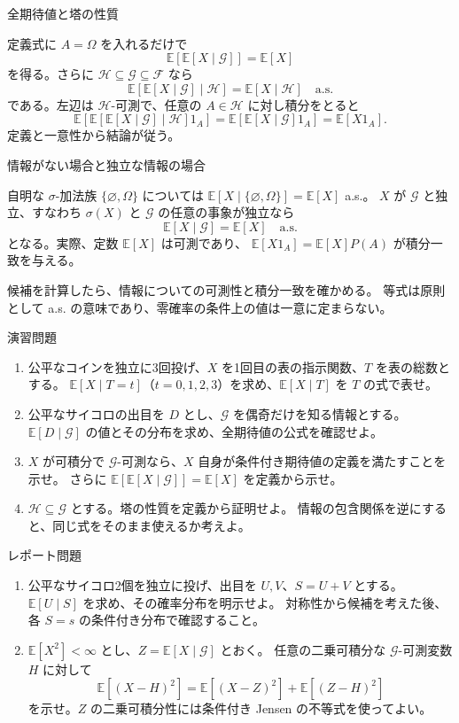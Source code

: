 \documentclass[a4paper,10pt,pdflatex,ja=standard,jafont=ipaex-type1,
  magstyle=real,scale=1]{bxjsarticle}
\newcommand{\topic}[1]{\par\vspace{5pt}
  {\large\sffamily\mdseries\color{accent}#1}\par\vspace{2pt}}
\newcommand{\keybox}[1]{\par\vspace{3pt}\begingroup
  \setlength{\fboxsep}{5pt}
  \colorbox{soft}{\parbox{\dimexpr\linewidth-2\fboxsep\relax}{#1}}%
  \endgroup\par\vspace{2pt}}
\newcommand{\F}{\mathcal F}
\newcommand{\E}{\mathbb E}
\newcommand{\ind}{\mathrm{1}}
\begin{document}
\topic{全期待値と塔の性質}
定義式に $A=\Omega$ を入れるだけで
$$\E[\E[X\mid\mathcal G]]=\E[X]$$
を得る。さらに $\mathcal H\subseteq\mathcal G\subseteq\F$ なら
$$\E[\E[X\mid\mathcal G]\mid\mathcal H]
 =\E[X\mid\mathcal H]\quad\text{a.s.}$$
である。左辺は $\mathcal H$-可測で、任意の $A\in\mathcal H$ に対し積分をとると
$$\E[\E[\E[X\mid\mathcal G]\mid\mathcal H]\ind_A]
 =\E[\E[X\mid\mathcal G]\ind_A]=\E[X\ind_A].$$
定義と一意性から結論が従う。

\topic{情報がない場合と独立な情報の場合}
自明な $\sigma$-加法族 $\{\varnothing,\Omega\}$ については
$\E[X\mid\{\varnothing,\Omega\}]=\E[X]$ a.s.。
$X$ が $\mathcal G$ と独立、すなわち $\sigma(X)$ と $\mathcal G$ の任意の事象が独立なら
$$\E[X\mid\mathcal G]=\E[X]\quad\text{a.s.}$$
となる。実際、定数 $\E[X]$ は可測であり、
$\E[X\ind_A]=\E[X]P(A)$ が積分一致を与える。

\keybox{候補を計算したら、情報についての可測性と積分一致を確かめる。
等式は原則として a.s. の意味であり、零確率の条件上の値は一意に定まらない。}

\newpage
\topic{演習問題}
\begin{enumerate}[label=\arabic*.]
\item 公平なコインを独立に3回投げ、$X$ を1回目の表の指示関数、$T$ を表の総数とする。
$\E[X\mid T=t]$（$t=0,1,2,3$）を求め、$\E[X\mid T]$ を $T$ の式で表せ。
\item 公平なサイコロの出目を $D$ とし、$\mathcal G$ を偶奇だけを知る情報とする。
$\E[D\mid\mathcal G]$ の値とその分布を求め、全期待値の公式を確認せよ。
\item $X$ が可積分で $\mathcal G$-可測なら、$X$ 自身が条件付き期待値の定義を満たすことを示せ。
さらに $\E[\E[X\mid\mathcal G]]=\E[X]$ を定義から示せ。
\item $\mathcal H\subseteq\mathcal G$ とする。塔の性質を定義から証明せよ。
情報の包含関係を逆にすると、同じ式をそのまま使えるか考えよ。
\end{enumerate}

\topic{レポート問題}
\begin{enumerate}[label=\arabic*.]
\item 公平なサイコロ2個を独立に投げ、出目を $U,V$、$S=U+V$ とする。
$\E[U\mid S]$ を求め、その確率分布を明示せよ。
対称性から候補を考えた後、各 $S=s$ の条件付き分布で確認すること。
\item $\E[X^2]<\infty$ とし、$Z=\E[X\mid\mathcal G]$ とおく。
任意の二乗可積分な $\mathcal G$-可測変数 $H$ に対して
$$\E[(X-H)^2]=\E[(X-Z)^2]+\E[(Z-H)^2]$$
を示せ。$Z$ の二乗可積分性には条件付き Jensen の不等式を使ってよい。
\end{enumerate}
\end{document}
